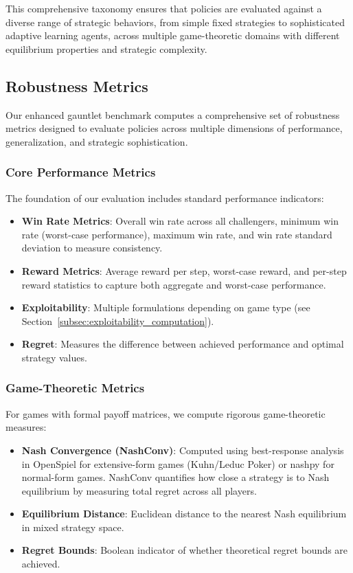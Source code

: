 \documentclass[sigconf,anonymous]{aamas}
\begin{document}
This comprehensive taxonomy ensures that policies are evaluated against a diverse range of strategic behaviors, from simple fixed strategies to sophisticated adaptive learning agents, across multiple game-theoretic domains with different equilibrium properties and strategic complexity.

\subsection{Robustness Metrics}

Our enhanced gauntlet benchmark computes a comprehensive set of robustness metrics designed to evaluate policies across multiple dimensions of performance, generalization, and strategic sophistication.

\subsubsection{Core Performance Metrics}
The foundation of our evaluation includes standard performance indicators:
\begin{itemize}
\item \textbf{Win Rate Metrics}: Overall win rate across all challengers, minimum win rate (worst-case performance), maximum win rate, and win rate standard deviation to measure consistency.
\item \textbf{Reward Metrics}: Average reward per step, worst-case reward, and per-step reward statistics to capture both aggregate and worst-case performance.
\item \textbf{Exploitability}: Multiple formulations depending on game type (see Section~\ref{subsec:exploitability_computation}).
\item \textbf{Regret}: Measures the difference between achieved performance and optimal strategy values.
\end{itemize}

\subsubsection{Game-Theoretic Metrics}
For games with formal payoff matrices, we compute rigorous game-theoretic measures:
\begin{itemize}
\item \textbf{Nash Convergence (NashConv)}: Computed using best-response analysis in OpenSpiel for extensive-form games (Kuhn/Leduc Poker) or nashpy for normal-form games. NashConv quantifies how close a strategy is to Nash equilibrium by measuring total regret across all players.
\item \textbf{Equilibrium Distance}: Euclidean distance to the nearest Nash equilibrium in mixed strategy space.
\item \textbf{Regret Bounds}: Boolean indicator of whether theoretical regret bounds are achieved.
\end{itemize}
\end{document}
